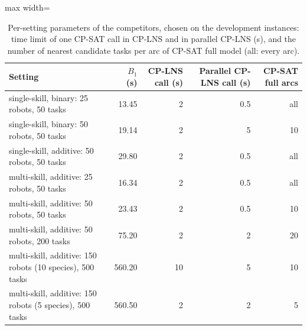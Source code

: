 \begin{table}[h]
\centering
\small
\caption{Per-setting parameters of the competitors, chosen on the development instances: time limit of one CP-SAT call in CP-LNS and in parallel CP-LNS (s), and the number of nearest candidate tasks per arc of CP-SAT full model (all: every arc).}
\label{tab:supp-params}
\begin{adjustbox}{max width=\textwidth}\begin{tabular}{lrrrr}
\toprule
Setting & $B_1$ (s) & CP-LNS call (s) & Parallel CP-LNS call (s) & CP-SAT full arcs \\
\midrule
single-skill, binary: 25 robots, 50 tasks & 13.45 & 2 & 0.5 & all \\
single-skill, binary: 50 robots, 50 tasks & 19.14 & 2 & 5 & 10 \\
single-skill, additive: 50 robots, 50 tasks & 29.80 & 2 & 0.5 & all \\
multi-skill, additive: 25 robots, 50 tasks & 16.34 & 2 & 0.5 & all \\
multi-skill, additive: 50 robots, 50 tasks & 23.43 & 2 & 0.5 & 10 \\
multi-skill, additive: 50 robots, 200 tasks & 75.20 & 2 & 2 & 20 \\
multi-skill, additive: 150 robots (10 species), 500 tasks & 560.20 & 10 & 5 & 10 \\
multi-skill, additive: 150 robots (5 species), 500 tasks & 560.50 & 2 & 2 & 5 \\
\bottomrule
\end{tabular}\end{adjustbox}
\end{table}
